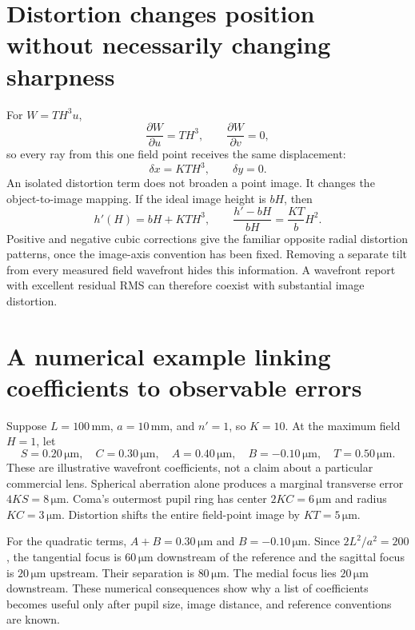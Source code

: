 \section{Distortion changes position without necessarily changing sharpness}
For $W=TH^3u$,
\begin{equation}
 \frac{\partial W}{\partial u}=TH^3,\qquad
 \frac{\partial W}{\partial v}=0,
\end{equation}
so every ray from this one field point receives the same displacement:
\begin{equation}
 \delta x=KTH^3,\qquad\delta y=0.
\end{equation}
An isolated distortion term does not broaden a point image. It changes the
object-to-image mapping. If the ideal image height is $bH$, then
\begin{equation}
 h'(H)=bH+KTH^3,\qquad
 \frac{h'-bH}{bH}=\frac{KT}{b}H^2.
\end{equation}
Positive and negative cubic corrections give the familiar opposite radial
distortion patterns, once the image-axis convention has been fixed.
Removing a separate tilt from every measured field wavefront hides this
information. A wavefront report with excellent residual RMS can therefore
coexist with substantial image distortion.

\section{A numerical example linking coefficients to observable errors}
Suppose $L=100\,\mathrm{mm}$, $a=10\,\mathrm{mm}$, and $n'=1$, so $K=10$.
At the maximum field $H=1$, let
\begin{equation}
 S=0.20\,\mathrm{\mu m},\quad C=0.30\,\mathrm{\mu m},\quad
 A=0.40\,\mathrm{\mu m},\quad B=-0.10\,\mathrm{\mu m},\quad
 T=0.50\,\mathrm{\mu m}.
\end{equation}
These are illustrative wavefront coefficients, not a claim about a particular
commercial lens. Spherical aberration alone produces a marginal transverse
error $4KS=8\,\mathrm{\mu m}$. Coma's outermost pupil ring has center
$2KC=6\,\mathrm{\mu m}$ and radius $KC=3\,\mathrm{\mu m}$. Distortion shifts
the entire field-point image by $KT=5\,\mathrm{\mu m}$.

For the quadratic terms, $A+B=0.30\,\mathrm{\mu m}$ and
$B=-0.10\,\mathrm{\mu m}$. Since $2L^2/a^2=200$, the tangential focus is
$60\,\mathrm{\mu m}$ downstream of the reference and the sagittal focus is
$20\,\mathrm{\mu m}$ upstream. Their separation is $80\,\mathrm{\mu m}$.
The medial focus lies $20\,\mathrm{\mu m}$ downstream. These numerical
consequences show why a list of coefficients becomes useful only after
pupil size, image distance, and reference conventions are known.

